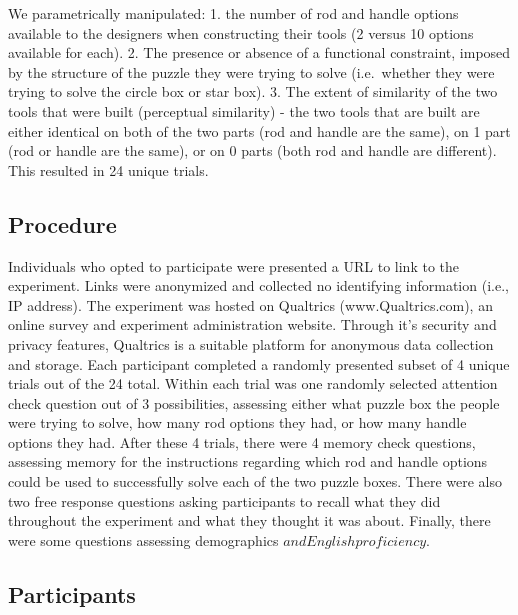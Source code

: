 \documentclass[10pt, letterpaper]{article}
\begin{document}
We parametrically manipulated: 1. the number of rod and handle options
available to the designers when constructing their tools (2 versus 10
options available for each). 2. The presence or absence of a functional
constraint, imposed by the structure of the puzzle they were trying to
solve (i.e.~whether they were trying to solve the circle box or star
box). 3. The extent of similarity of the two tools that were built
(perceptual similarity) - the two tools that are built are either
identical on both of the two parts (rod and handle are the same), on 1
part (rod or handle are the same), or on 0 parts (both rod and handle
are different). This resulted in 24 unique trials.

\subsection{Procedure}\label{procedure}

Individuals who opted to participate were presented a URL to link to the
experiment. Links were anonymized and collected no identifying
information (i.e., IP address). The experiment was hosted on Qualtrics
(www.Qualtrics.com), an online survey and experiment administration
website. Through it's security and privacy features, Qualtrics is a
suitable platform for anonymous data collection and storage. Each
participant completed a randomly presented subset of 4 unique trials out
of the 24 total. Within each trial was one randomly selected attention
check question out of 3 possibilities, assessing either what puzzle box
the people were trying to solve, how many rod options they had, or how
many handle options they had. After these 4 trials, there were 4 memory
check questions, assessing memory for the instructions regarding which
rod and handle options could be used to successfully solve each of the
two puzzle boxes. There were also two free response questions asking
participants to recall what they did throughout the experiment and what
they thought it was about. Finally, there were some questions assessing
demographics \(and English proficiency\).

\subsection{Participants}\label{participants}
\end{document}
